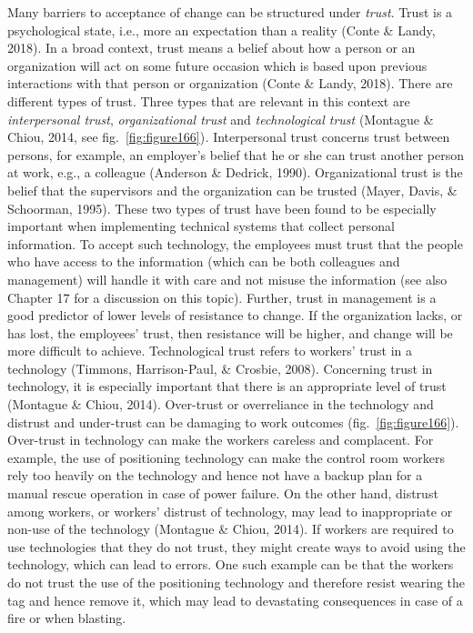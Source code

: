 \documentclass[
  12pt,
]{scrbook}
\begin{document}
Many barriers to acceptance of change can be structured under \emph{trust}. Trust is a psychological state, i.e., more an expectation than a reality (Conte \& Landy, 2018). In a broad context, trust means a belief about how a person or an organization will act on some future occasion which is based upon previous interactions with that person or organization (Conte \& Landy, 2018). There are different types of trust. Three types that are relevant in this context are \emph{interpersonal trust}, \emph{organizational trust} and \emph{technological trust} (Montague \& Chiou, 2014, see fig.~\ref{fig:figure166})\emph{.} Interpersonal trust concerns trust between persons, for example, an employer's belief that he or she can trust another person at work, e.g., a colleague (Anderson \& Dedrick, 1990). Organizational trust is the belief that the supervisors and the organization can be trusted (Mayer, Davis, \& Schoorman, 1995). These two types of trust have been found to be especially important when implementing technical systems that collect personal information. To accept such technology, the employees must trust that the people who have access to the information (which can be both colleagues and management) will handle it with care and not misuse the information (see also Chapter 17 for a discussion on this topic). Further, trust in management is a good predictor of lower levels of resistance to change. If the organization lacks, or has lost, the employees' trust, then resistance will be higher, and change will be more difficult to achieve. Technological trust refers to workers' trust in a technology (Timmons, Harrison-Paul, \& Crosbie, 2008). Concerning trust in technology, it is especially important that there is an appropriate level of trust (Montague \& Chiou, 2014). Over-trust or overreliance in the technology and distrust and under-trust can be damaging to work outcomes (fig.~\ref{fig:figure166}). Over-trust in technology can make the workers careless and complacent. For example, the use of positioning technology can make the control room workers rely too heavily on the technology and hence not have a backup plan for a manual rescue operation in case of power failure. On the other hand, distrust among workers, or workers' distrust of technology, may lead to inappropriate or non-use of the technology (Montague \& Chiou, 2014). If workers are required to use technologies that they do not trust, they might create ways to avoid using the technology, which can lead to errors. One such example can be that the workers do not trust the use of the positioning technology and therefore resist wearing the tag and hence remove it, which may lead to devastating consequences in case of a fire or when blasting.
\end{document}
